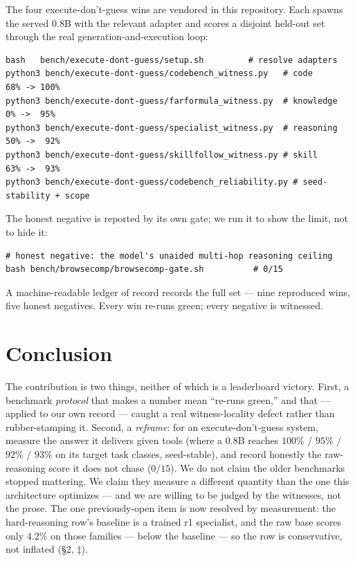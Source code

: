 \documentclass[11pt]{article}
\begin{document}
The four execute-don't-guess wins are vendored in this repository. Each spawns the
served 0.8B with the relevant adapter and scores a disjoint held-out set through the
real generation-and-execution loop:

\begin{verbatim}
bash   bench/execute-dont-guess/setup.sh         # resolve adapters
python3 bench/execute-dont-guess/codebench_witness.py   # code        68% -> 100%
python3 bench/execute-dont-guess/farformula_witness.py  # knowledge    0% ->  95%
python3 bench/execute-dont-guess/specialist_witness.py  # reasoning   50% ->  92%
python3 bench/execute-dont-guess/skillfollow_witness.py # skill       63% ->  93%
python3 bench/execute-dont-guess/codebench_reliability.py # seed-stability + scope
\end{verbatim}

The honest negative is reported by its own gate; we run it to show the limit, not to
hide it:

\begin{verbatim}
# honest negative: the model's unaided multi-hop reasoning ceiling
bash bench/browsecomp/browsecomp-gate.sh          # 0/15
\end{verbatim}

A machine-readable ledger of record records the full set --- nine reproduced wins,
five honest negatives. Every win re-runs green; every negative is witnessed.

\section{Conclusion}
The contribution is two things, neither of which is a leaderboard victory. First, a
benchmark \emph{protocol} that makes a number mean ``re-runs green,'' and that ---
applied to our own record --- caught a real witness-locality defect rather than
rubber-stamping it. Second, a \emph{reframe}: for an execute-don't-guess system,
measure the answer it delivers given tools (where a 0.8B reaches $100\%$ / $95\%$ /
$92\%$ / $93\%$ on its target task classes, seed-stable), and record honestly the
raw-reasoning score it does not chase ($0/15$). We do not claim the older benchmarks
stopped mattering. We claim they measure a different quantity than the one this
architecture optimizes --- and we are willing to be judged by the witnesses, not the
prose. The one previously-open item is now resolved by measurement: the hard-reasoning
row's baseline is a trained r1 specialist, and the raw base scores only $4.2\%$ on those
families --- below the baseline --- so the row is conservative, not inflated (\S2,
$\ddagger$).
\end{document}
